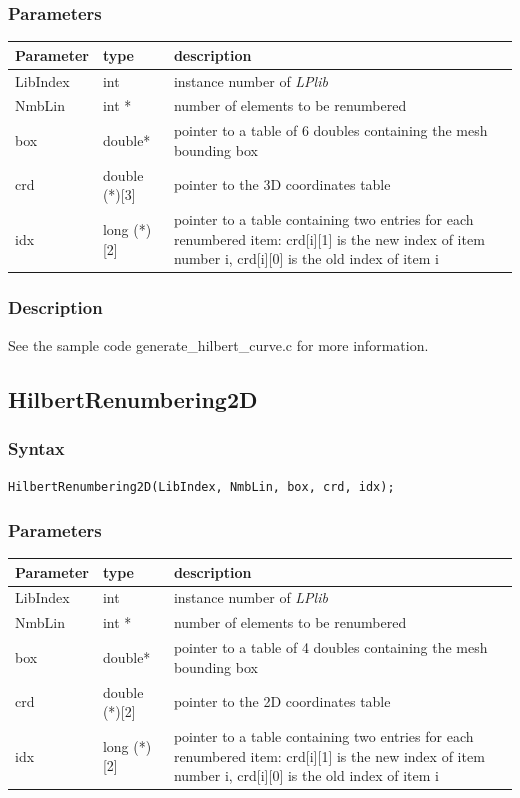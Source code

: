 \documentclass[a4paper,12pt]{article}
\begin{document}
\subsubsection*{Parameters}
\begin{tabular}{|m{2cm}|m{3cm}|m{8cm}|}
\hline
Parameter  & type   & description \\
\hline
LibIndex   & int    & instance number of \emph{LPlib} \\
\hline
NmbLin     & int * & number of elements to be renumbered \\
\hline
box        & double* & pointer to a table of 6 doubles containing the mesh bounding box \\
\hline
crd        & double (*)[3] & pointer to the 3D coordinates table \\
\hline
idx        & long (*)[2] & pointer to a table containing two entries for each renumbered item: crd[i][1] is the new index of item number i, crd[i][0] is the old index of item i \\
\hline
\end{tabular}

\subsubsection*{Description}
See the sample code generate\_hilbert\_curve.c for more information.


\subsection{HilbertRenumbering2D}

\subsubsection*{Syntax}
\tt{HilbertRenumbering2D(LibIndex, NmbLin, box, crd, idx);}
\normalfont

\subsubsection*{Parameters}
\begin{tabular}{|m{2cm}|m{3cm}|m{8cm}|}
\hline
Parameter  & type   & description \\
\hline
LibIndex   & int    & instance number of \emph{LPlib} \\
\hline
NmbLin     & int * & number of elements to be renumbered \\
\hline
box        & double* & pointer to a table of 4 doubles containing the mesh bounding box \\
\hline
crd        & double (*)[2] & pointer to the 2D coordinates table \\
\hline
idx        & long (*)[2] & pointer to a table containing two entries for each renumbered item: crd[i][1] is the new index of item number i, crd[i][0] is the old index of item i \\
\hline
\end{tabular}
\end{document}
